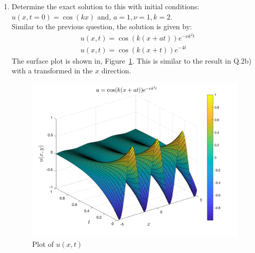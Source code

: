 \documentclass[11pt]{article}
\begin{document}
\begin{enumerate}
\begin{enumerate}[label = (\alph*)]
\item{\color{blue} Determine the exact solution to this with initial conditions:} $u(x,t=0) = \cos(kx)$ and, $a=1,\nu=1,k=2$.\\
Similar to the previous question, the solution is given by:
\begin{align*}
& u(x,t) = \cos(k(x+at))e^{-\nu k^2 t}\\
& u(x,t) = \cos(k(x+t))e^{-4t}
\end{align*}
The surface plot is shown in, Figure~\ref{fig: q3b}. This is similar to the result in Q.2b) with a transformed in the $x$ direction. 
\begin{figure}[htp]
\begin{center}
\includegraphics[width = 5in]{q3b}
\caption{Plot of $u(x,t)$}
\label{fig: q3b}
\end{center}
\end{figure}


\end{enumerate}
\end{enumerate}
\end{document}

